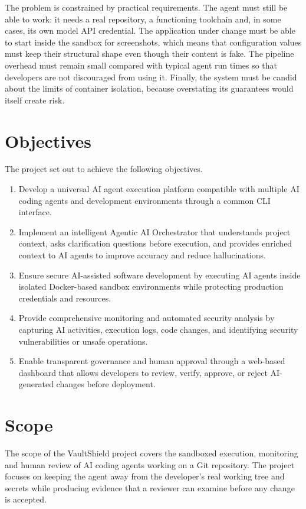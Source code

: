 \documentclass[12pt,a4paper,oneside]{report}
\providecommand{\tightlist}{\setlength{\itemsep}{0pt}\setlength{\parskip}{0pt}}
\begin{document}
The problem is constrained by practical requirements. The agent must still be able to work: it needs a real repository, a functioning toolchain and, in some cases, its own model API credential. The application under change must be able to start inside the sandbox for screenshots, which means that configuration values must keep their structural shape even though their content is fake. The pipeline overhead must remain small compared with typical agent run times so that developers are not discouraged from using it. Finally, the system must be candid about the limits of container isolation, because overstating its guarantees would itself create risk.

\section{Objectives}\label{objectives}

The project set out to achieve the following objectives.
\begin{enumerate}
\def\labelenumi{\arabic{enumi}.}
\tightlist
\item
  Develop a universal AI agent execution platform compatible with multiple AI coding agents and development environments through a common CLI interface.
\item
  Implement an intelligent Agentic AI Orchestrator that understands project context, asks clarification questions before execution, and provides enriched context to AI agents to improve accuracy and reduce hallucinations.
\item
  Ensure secure AI-assisted software development by executing AI agents inside isolated Docker-based sandbox environments while protecting production credentials and resources.
\item
  Provide comprehensive monitoring and automated security analysis by capturing AI activities, execution logs, code changes, and identifying security vulnerabilities or unsafe operations.
\item
  Enable transparent governance and human approval through a web-based dashboard that allows developers to review, verify, approve, or reject AI-generated changes before deployment.
\end{enumerate}

\section{Scope}\label{scope}

The scope of the VaultShield project covers the sandboxed execution, monitoring and human review of AI coding agents working on a Git repository. The project focuses on keeping the agent away from the developer's real working tree and secrets while producing evidence that a reviewer can examine before any change is accepted.
\end{document}
